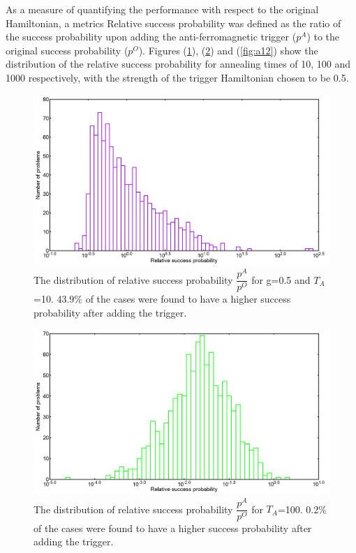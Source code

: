 \documentclass[12]{article}
\begin{document}
As a measure of quantifying the performance with respect to the original Hamiltonian, a metrics Relative success probability was defined as the ratio of the success probability upon adding the anti-ferromagnetic trigger ($p^A$) to the original success probability ($p^O$). Figures (\ref{fig:a10}), (\ref{fig:a11}) and (\ref{fig:a12}) show the  distribution of the relative success probability for annealing times of 10, 100 and 1000 respectively, with the strength of the trigger Hamiltonian chosen to be 0.5.

\begin{figure}[H]
\centering 
\includegraphics[scale=0.3]{A_T10_g0.png}
\caption{The distribution of relative success probability $\dfrac{p^A}{p^O}$ for g=0.5 and $T_A$=10. 43.9\% of the cases were found to have a higher success probability after adding the trigger.}
\label{fig:a10}
\end{figure}
\begin{figure}[H]
\centering 
\includegraphics[scale=0.3]{A_T100_g0.png}
\caption{The distribution of relative success probability $\dfrac{p^A}{p^O}$ for $T_A$=100. 0.2\% of the cases were found to have a higher success probability after adding the trigger. }
\label{fig:a11}
\end{figure}
\end{document}
